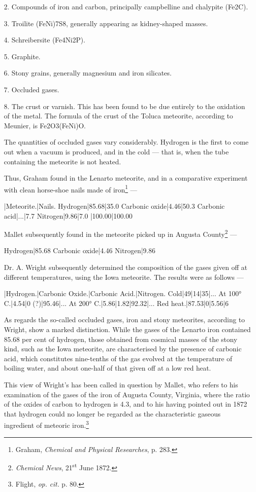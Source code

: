 \documentclass[a4paper, 12pt, oneside, polutonikogreek, english]{article}
\begin{document}
2. Compounds of iron and carbon, principally campbelline and chalypite (Fe2C).

3. Troilite (FeNi)7S8, generally appearing as kidney-shaped masses.

4. Schreibersite (Fe4Ni2P).

5. Graphite.

6. Stony grains, generally magnesium and iron silicates.

7. Occluded gases.

8. The crust or varnish. This has been found to be due entirely to the oxidation of the metal. The formula of the crust of the Toluca meteorite, according to Meunier, is Fe2O3(FeNi)O.

The quantities of occluded gases vary considerably. Hydrogen is the first to come out when a vacuum is produced, and in the cold --- that is, when the tube containing the meteorite is not heated.

Thus, Graham found in the Lenarto meteorite, and in a comparative experiment with clean horse-shoe nails made of iron\footnote{Graham, \emph{Chemical and Physical Researches}, p. 283.} ---

|Meteorite.|Nails. 
Hydrogen|85.68|35.0 
Carbonic oxide|4.46|50.3 
Carbonic acid|...|7.7 
Nitrogen|9.86|7.0 
|100.00|100.00

Mallet subsequently found in the meteorite picked up in Augusta County\footnote{\emph{Chemical News}, 21\textsuperscript{st} June 1872.} ---

Hydrogen|85.68 
Carbonic oxide|4.46 
Nitrogen|9.86

Dr. A. Wright subsequently determined the composition of the gases given off at different temperatures, using the Iowa meteorite. The results were as follows ---

|Hydrogen.|Carbonic Oxide.|Carbonic Acid.|Nitrogen. 
Cold|49|14|35|... 
At 100° C.|4.54|0 (?)|95.46|... 
At 200° C.|5.86|1.82|92.32|... 
Red heat.|87.53|0|5.56|6

As regards the so-called occluded gases, iron and stony meteorites, according to Wright, show a marked distinction. While the gases of the Lenarto iron contained 85.68 per cent of hydrogen, those obtained from cosmical masses of the stony kind, such as the Iowa meteorite, are characterised by the presence of carbonic acid, which constitutes nine-tenths of the gas evolved at the temperature of boiling water, and about one-half of that given off at a low red heat.

This view of Wright's has been called in question by Mallet, who refers to his examination of the gases of the iron of Augusta County, Virginia, where the ratio of the oxides of carbon to hydrogen is 4.3, and to his having pointed out in 1872 that hydrogen could no longer be regarded as the characteristic gaseous ingredient of meteoric iron.\footnote{Flight, \emph{op. cit.} p. 80.}
\end{document}
